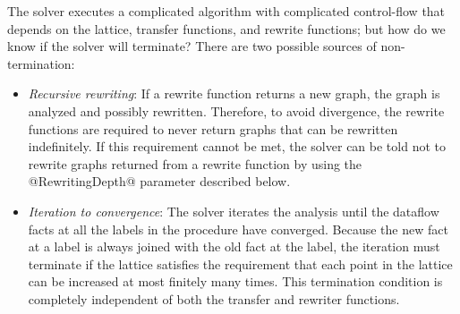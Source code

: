 \documentclass[blockstyle,preprint,nocopyrightspace]{sigplanconf}
\newcommand{\authornote}[1]{{\em #1}}
\def\authornote#1{\unskip\relax}
\newcommand{\simon}[1]{\authornote{SLPJ: #1}}
\newcommand\secref[1]{Section~\ref{sec:#1}}
\begin{document}
The solver executes a complicated algorithm with complicated control-flow
that depends on the lattice, transfer functions, and rewrite functions;
but how do we know if the solver will terminate?
There are two possible sources of non-termination:
\begin{itemize}
\item \emph{Recursive rewriting}:
  If a rewrite function returns a new graph, the graph is analyzed
  and possibly rewritten.
  Therefore, to avoid divergence,
  the rewrite functions are required to never return graphs that can be 
  rewritten indefinitely.
  If this requirement cannot be met,
  the solver can be told not to rewrite graphs returned from a rewrite function
  by using the @RewritingDepth@ parameter described below.
\item \emph{Iteration to convergence}:
  The solver iterates the analysis until the dataflow facts at all the
  labels in the procedure have converged.
  Because the new fact at a label is always joined with the old fact
  at the label, the iteration must terminate if the lattice satisfies
  the requirement that each point in the lattice can be increased at
  most finitely many times.
  This termination condition is completely independent of both
  the transfer and rewriter functions.
\end{itemize}


\simon{But do we apply rewrites even before the analysis reaches a fixed point?
If so, what property do the rewrites have to satisfy to ensure soundness?
If not, even a single rewrite might destroy the fixed-point property of the
current facts.  Or perhaps we iterate the analysis to a fixpoint, and only \emph{then}
do rewriting? If so, do we need the transfer functions at that stage?

Also the fixed-point of the analysis relies on upward chains. What if
the rewrite pushed it downward?  Or is it the case that a rewrite must
change a node $n$ into a graph $g$ so 
that $\mathit{fwdtrans}(n) \leq \mathit{fwdtrans}(g)$?

Also the fixpoint calculation requires multiple passses; do the 
rewrites then apply multiple times?

I'm deliberately playing the role of the reader here, and not peeking at
the code.  I don't think it's enough to say ``go look at Chambers paper''; 
I suggest we say enough (half a column would do it) to address the obvious
questions and point to Chambers for details.


\textbf{NR}: Good questions, but let's have a forward reference to \secref{dfengine}}
\end{document}

